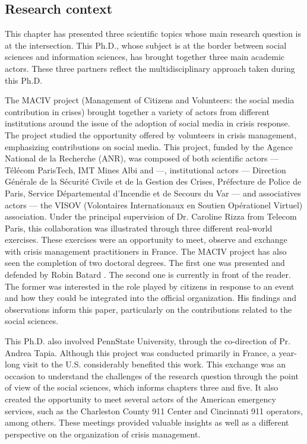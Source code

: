 \subsection{Research context}
This chapter has presented three scientific topics whose main research question is at the intersection.
This Ph.D., whose subject is at the border between social sciences and information sciences, has brought together three main academic actors.
These three partners reflect the multidisciplinary approach taken during this Ph.D.

The MACIV project (Management of Citizens and Volunteers: the social media contribution in crises) brought together a variety of actors from different institutions around the issue of the adoption of social media in crisis response.
The project studied the opportunity offered by volunteers in crisis management, emphasizing contributions on social media.
This project, funded by the Agence National de la Recherche (ANR), was composed of both
scientific actors — Télécom ParisTech, IMT Mines Albi and —,
institutional actors — Direction Générale de la Sécurité Civile et de la Gestion des Crises, Préfecture de Police de Paris, Service Départemental d'Incendie et de Secours du Var — and
associatives actors — the VISOV (Volontaires Internationaux en Soutien Opérationel Virtuel) association.
Under the principal supervision of Dr. Caroline Rizza from Telecom Paris, this collaboration was illustrated through three different real-world exercises.
These exercises were an opportunity to meet, observe and exchange with crisis management practitioners in France.
The MACIV project has also seen the completion of two doctoral degrees.
The first one was presented and defended by Robin Batard \parencite{batardIntegrerContributionsCitoyennes2021}.
The second one is currently in front of the reader.
The former was interested in the role played by citizens in response to an event and how they could be integrated into the official organization.
His findings and observations inform this paper, particularly on the contributions related to the social sciences.

This Ph.D. also involved PennState University, through the co-direction of Pr. Andrea Tapia.
Although this project was conducted primarily in France, a year-long visit to the U.S. considerably benefited this work.
This exchange was an occasion to understand the challenges of the research question through the point of view of the social sciences, which informs chapters three and five.
It also created the opportunity to meet several actors of the American emergency services, such as the Charleston County 911 Center and Cincinnati 911 operators, among others.
These meetings provided valuable insights as well as a different perspective on the organization of crisis management.

